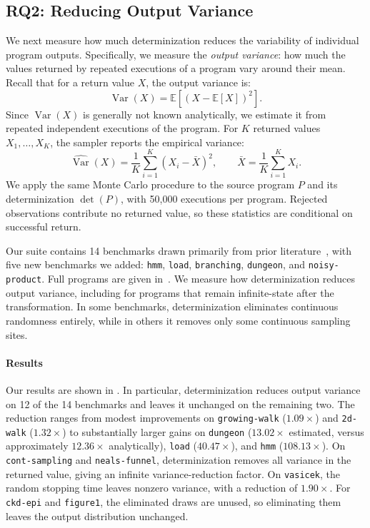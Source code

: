 \subsection{RQ2: Reducing Output Variance}

We next measure how much determinization reduces the variability of individual program outputs. Specifically, we measure the \emph{output variance}: how much the values returned by repeated executions of a program vary around their mean. Recall that for a return value $X$, the output variance is:
\[
\operatorname{Var}(X)
=
\mathbb{E}\!\left[(X-\mathbb{E}[X])^2\right].
\]
Since $\operatorname{Var}(X)$ is generally not known analytically, we estimate it from repeated independent executions of the program. For $K$ returned values $X_1,\ldots,X_K$, the sampler reports the empirical variance:
\[
\widehat{\operatorname{Var}}(X)
=
\frac{1}{K}\sum_{i=1}^{K}(X_i-\bar X)^2,
\qquad
\bar X=\frac{1}{K}\sum_{i=1}^{K}X_i.
\]
We apply the same Monte Carlo procedure to the source program $P$ and its determinization $\det(P)$, with 50,000 executions per program. Rejected observations contribute no returned value, so these statistics are conditional on successful return.

Our suite contains 14 benchmarks drawn primarily from prior literature~\cite{batz2021latticed,moosbrugger2022moment,bartocci2020mora,feng2023lower,beutner2022guaranteed,karimi2022distribution}, with five new benchmarks we added: \texttt{hmm}, \texttt{load}, \texttt{branching}, \texttt{dungeon}, and \texttt{noisy-product}. Full programs are given in~. We measure how determinization reduces output variance, including for programs that remain infinite-state after the transformation. In some benchmarks, determinization eliminates continuous randomness entirely, while in others it removes only some continuous sampling sites.

\paragraph{Results} Our results are shown in . In particular, determinization reduces output variance on 12 of the 14 benchmarks and leaves it unchanged on the remaining two. The reduction ranges from modest improvements on \texttt{growing-walk} ($1.09\times$) and \texttt{2d-walk} ($1.32\times$) to substantially larger gains on \texttt{dungeon} ($13.02\times$ estimated, versus approximately $12.36\times$ analytically), \texttt{load} ($40.47\times$), and \texttt{hmm} ($108.13\times$). On \texttt{cont-sampling} and \texttt{neals-funnel}, determinization removes all variance in the returned value, giving an infinite variance-reduction factor. On \texttt{vasicek}, the random stopping time leaves nonzero variance, with a reduction of $1.90\times$. For \texttt{ckd-epi} and \texttt{figure1}, the eliminated draws are unused, so eliminating them leaves the output distribution unchanged.


